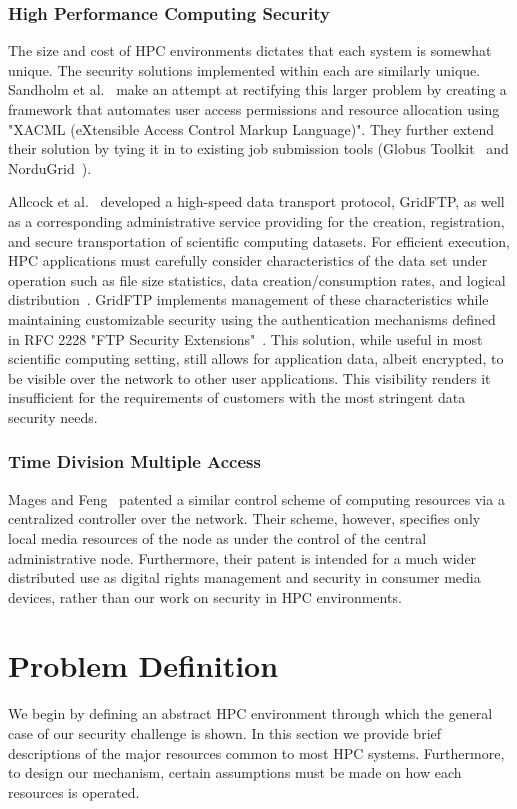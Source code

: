 \documentclass[oneside,12pt]{memoir}
\begin{document}
\subsection{High Performance Computing Security}
The size and cost of HPC environments dictates that each system is somewhat unique. The security solutions implemented within each are similarly unique. Sandholm et al.~\cite{sandholm2004ogsa} make an attempt at rectifying this larger problem by creating a framework that automates user access permissions and resource allocation using "XACML (eXtensible Access Control Markup Language)". They further extend their solution by tying it in to existing job submission tools (Globus Toolkit~\cite{globus_toolkit} and NorduGrid~\cite{nordugrid}). 

Allcock et al.~\cite{allcock2001secure} developed a high-speed data transport protocol, GridFTP, as well as a corresponding administrative service providing for the creation, registration, and secure transportation of scientific computing datasets. For efficient execution, HPC applications must carefully consider characteristics of the data set under operation such as file size statistics, data creation/consumption rates, and logical distribution~\cite{chervenak2000data}. GridFTP implements management of these characteristics while maintaining customizable security using the authentication mechanisms defined in RFC 2228 "FTP Security Extensions"~\cite{horowitz1997ftp}. This solution, while useful in most scientific computing setting, still allows for application data, albeit encrypted, to be visible over the network to other user applications. This visibility renders it insufficient for the requirements of customers with the most stringent data security needs.
\subsection{Time Division Multiple Access}
Mages and Feng~\cite{mages1999method} patented a similar control scheme of computing resources via a centralized controller over the network. Their scheme, however, specifies only local media resources of the node as under the control of the central administrative node. Furthermore, their patent is intended for a much wider distributed use as digital rights management and security in consumer media devices, rather than our work on security in HPC environments.

\chapter{Problem Definition}
\label{chap:problem_definition}
We begin by defining an abstract HPC environment through which the general case of our security challenge is shown. In this section we provide brief descriptions of the major resources common to most HPC systems. Furthermore, to design our mechanism, certain assumptions must be made on how each resources is operated. 
\end{document}
